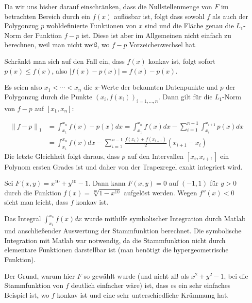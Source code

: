 \documentclass[a4paper,11pt,bibliography=totoc,listof=totoc,headinclude=true,cleardoublepage=empty,oneside]{scrartcl}
\newcommand{\norm}[2]{\left\| #1 \right\|_{#2}}
\begin{document}
Da wir uns bisher darauf einschränken, dass die Nullstellenmenge von $F$ im betrachten Bereich durch ein $f(x)$ auflösbar ist, folgt dass sowohl $f$ als auch der Polygonzug $p$ wohldefinierte Funktionen von $x$ sind und die Fläche genau die $L_1$-Norm der Funktion $f-p$ ist. Diese ist aber im Allgemeinen nicht einfach zu berechnen, weil man nicht weiß, wo $f-p$ Vorzeichenwechsel hat. 

Schränkt man sich auf den Fall ein, dass $f(x)$ konkav ist, folgt sofort $p(x) \le f(x)$, also $|f(x)-p(x)|=f(x)-p(x)$.

Es seien also $x_1<\cdots < x_n$ die $x$-Werte der bekannten Datenpunkte und $p$ der Polygonzug durch die Punkte $(x_i,f(x_i))_{i=1,\dots,n}$. Dann gilt für die $L_1$-Norm von $f-p$ auf $[x_1,x_n]$:

\begin{align*}
\norm{f-p}{1} &= \int_{x_1}^{x_n}\!\! f(x)-p(x) dx = \int_{x_1}^{x_n}\!\! f(x) dx - \sum_{i=1}^{n-1} \int_{x_i}^{x_{i+1}}\!\! p(x) dx \\
&=  \int_{x_1}^{x_n}\!\! f(x) dx - \sum_{i=1}^{n-1} \frac{f(x_{i})+f(x_{i+1})}{2} (x_{i+1}-x_i)
\end{align*}
Die letzte Gleichheit folgt daraus, dass $p$ auf den Intervallen $[x_i,x_{i+1}]$ ein Polynom ersten Grades ist und daher von der Trapezregel exakt integriert wird. 

Sei $F(x,y)= x^{10} +y^{10}-1$. Dann kann $F(x,y)=0$ auf $(-1,1)$ für $y>0$ durch die Funktion $f(x)= \sqrt[10]{1-x^{10}}$ aufgelöst werden. Wegen $f''(x) <0$ sieht man leicht, dass $f$ konkav ist. 

Das Integral $ \int_{x_1}^{x_n}\!\! f(x) dx$ wurde mithilfe symbolischer Integration durch Matlab und anschließender Auswertung der Stammfunktion berechnet. Die symbolische Integration mit Matlab war notwendig, da die Stammfunktion nicht durch elementare Funktionen darstellbar ist (man benötigt die hypergeometrische Funktion). 

Der Grund, warum hier $F$ so gewählt wurde (und nicht zB als $x^2+y^2-1$, bei die Stammfunktion von $f$ deutlich einfacher wäre) ist, dass es ein sehr einfaches Beispiel ist, wo $f$ konkav ist und eine sehr unterschiedliche Krümmung hat. 
\end{document}
